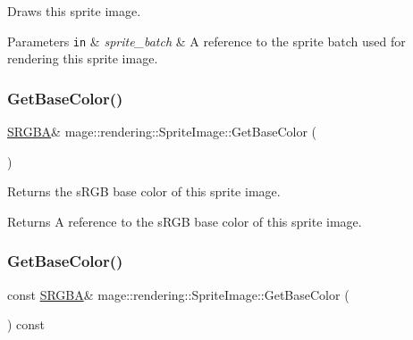 Draws this sprite image.


\begin{DoxyParams}[1]{Parameters}
\mbox{\tt in}  & {\em sprite\+\_\+batch} & A reference to the sprite batch used for rendering this sprite image. \\
\hline
\end{DoxyParams}
\hypertarget{classmage_1_1rendering_1_1_sprite_image_ad3c4f224a6cf943930fc2d9222e6ec59}{}\label{classmage_1_1rendering_1_1_sprite_image_ad3c4f224a6cf943930fc2d9222e6ec59} 
\subsubsection{\texorpdfstring{Get\+Base\+Color()}{GetBaseColor()}\hspace{0.1cm}{\footnotesize\ttfamily [1/2]}}
{\footnotesize\ttfamily \hyperlink{structmage_1_1_s_r_g_b_a}{S\+R\+G\+BA}\& mage\+::rendering\+::\+Sprite\+Image\+::\+Get\+Base\+Color (\begin{DoxyParamCaption}{ }\end{DoxyParamCaption})\hspace{0.3cm}{\ttfamily [noexcept]}}

Returns the s\+R\+GB base color of this sprite image.

\begin{DoxyReturn}{Returns}
A reference to the s\+R\+GB base color of this sprite image. 
\end{DoxyReturn}
\hypertarget{classmage_1_1rendering_1_1_sprite_image_aab9942459788c0463782b06bcd0fb6c8}{}\label{classmage_1_1rendering_1_1_sprite_image_aab9942459788c0463782b06bcd0fb6c8} 
\subsubsection{\texorpdfstring{Get\+Base\+Color()}{GetBaseColor()}\hspace{0.1cm}{\footnotesize\ttfamily [2/2]}}
{\footnotesize\ttfamily const \hyperlink{structmage_1_1_s_r_g_b_a}{S\+R\+G\+BA}\& mage\+::rendering\+::\+Sprite\+Image\+::\+Get\+Base\+Color (\begin{DoxyParamCaption}{ }\end{DoxyParamCaption}) const\hspace{0.3cm}{\ttfamily [noexcept]}}

